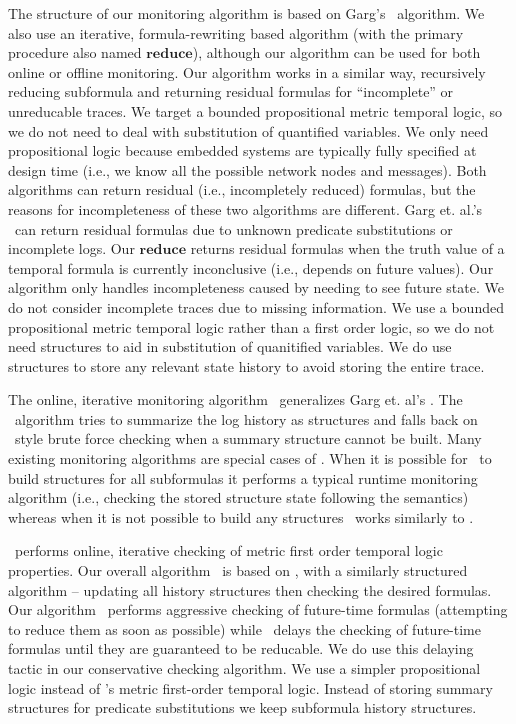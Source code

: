 The structure of our monitoring algorithm is based on Garg's \greduce\ algorithm. 
We also use an iterative, formula-rewriting based algorithm (with the primary procedure also named $\mathbf{reduce}$), although our algorithm can be used for both online or offline monitoring. 
Our algorithm works in a similar way, recursively reducing subformula and returning residual formulas for ``incomplete'' or unreducable traces. We target a bounded propositional metric temporal logic, so we do not need to deal with substitution of quantified variables. We only need propositional logic because embedded systems are typically fully specified at design time (i.e., we know all the possible network nodes and messages).
%
Both algorithms can return residual (i.e., incompletely reduced) formulas, but the reasons for incompleteness of these two algorithms are different. Garg et. al.'s \greduce\ can return residual formulas due to unknown predicate substitutions or incomplete logs. Our $\mathbf{reduce}$ returns residual formulas when the truth value of a temporal formula is currently inconclusive (i.e., depends on future values).
%
Our algorithm only handles incompleteness caused by needing to see future state. We do not consider incomplete traces due to missing information. 
We use a bounded propositional metric temporal logic rather than a first order logic, so we do not need structures to aid in substitution of quanitified variables. 
We do use structures to store any relevant state history to avoid storing the entire trace.

The online, iterative monitoring algorithm \precis\ generalizes Garg et. al's \greduce. 
The \precis\ algorithm tries to summarize the log history as structures and falls back on \greduce\ style brute force checking when a summary structure cannot be built.
Many existing monitoring algorithms are special cases of \precis.
When it is possible for \precis\ to build structures for all subformulas it performs a typical runtime monitoring algorithm (i.e., checking the stored structure state following the semantics) whereas when it is not possible to build any structures \precis\ works similarly to \greduce.

\precis\ performs online, iterative checking of metric first order temporal logic properties. 
Our overall algorithm \agmon\ is based on \precis, with a similarly structured algorithm -- updating all history structures then checking the desired formulas. Our algorithm \agmon\ performs aggressive checking of future-time formulas (attempting to reduce them as soon as possible) while \precis\ delays the checking of future-time formulas until they are guaranteed to be reducable. We do use this delaying tactic in our conservative checking algorithm.
We use a simpler propositional logic instead of \precis{}'s metric first-order temporal logic. Instead of storing summary structures for predicate substitutions we keep subformula history structures.


